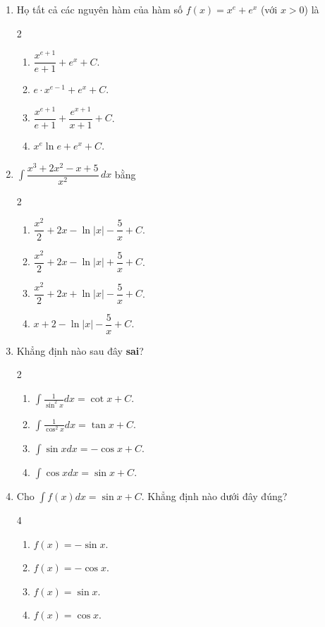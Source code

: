 \documentclass[12pt]{article}
\begin{document}
\begin{enumerate}[label=\textbf{Câu \arabic*.}]
		\item Họ tất cả các nguyên hàm của hàm số $f(x) = x^e + e^x$ (với $x > 0$) là
		\begin{multicols}{2}
			\begin{enumerate}[label=\textbf{\Alph*.}]
				\item $\dfrac{x^{e+1}}{e+1} + e^x + C$.
				\item $e \cdot x^{e-1} + e^x + C$.
				\item $\dfrac{x^{e+1}}{e+1} + \dfrac{e^{x+1}}{x+1} + C$.
				\item $x^e \ln e + e^x + C$.
			\end{enumerate}
		\end{multicols}
		
		\item $\displaystyle \int \dfrac{x^3 + 2x^2 - x + 5}{x^2} \,dx$ bằng
		\begin{multicols}{2}
			\begin{enumerate}[label=\textbf{\Alph*.}]
				\item $\dfrac{x^2}{2} + 2x - \ln|x| - \dfrac{5}{x} + C$.
				\item $\dfrac{x^2}{2} + 2x - \ln|x| + \dfrac{5}{x} + C$.
				\item $\dfrac{x^2}{2} + 2x + \ln|x| - \dfrac{5}{x} + C$.
				\item $x + 2 - \ln|x| - \dfrac{5}{x} + C$.
			\end{enumerate}
		\end{multicols}
		
		\item Khẳng định nào sau đây \textbf{sai}?
		\begin{multicols}{2}
			\begin{enumerate}[label=\textbf{\Alph*.}]
				\item $\displaystyle \int \frac{1}{\sin^2 x} dx = \cot x + C$.
				\item $\displaystyle \int \frac{1}{\cos^2 x} dx = \tan x + C$.
				\item $\displaystyle \int \sin x dx = -\cos x + C$.
				\item $\displaystyle \int \cos x dx = \sin x + C$.
			\end{enumerate}
		\end{multicols}
		
		\item Cho $\displaystyle \int f(x)dx = \sin x + C$. Khẳng định nào dưới đây đúng?
		\begin{multicols}{4}
			\begin{enumerate}[label=\textbf{\Alph*.}]
				\item $f(x) = -\sin x$.
				\item $f(x) = -\cos x$.
				\item $f(x) = \sin x$.
				\item $f(x) = \cos x$.
			\end{enumerate}
		\end{multicols}
		

\end{enumerate}
\end{document}
